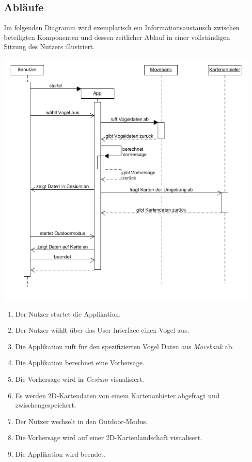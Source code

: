 \documentclass[12pt]{article} %
\newenvironment{cptenumerate}[1][label=\arabic*.]{\begin{enumerate}[#1] \setlength\itemsep{0em}}{\end{enumerate}}
\begin{document}
\subsection{Abläufe}

Im folgenden Diagramm wird exemplarisch ein Informationsaustausch zwischen beteiligten Komponenten und dessen zeitlicher Ablauf in einer vollständigen Sitzung des Nutzers illustriert. 

\includegraphics[width = 1\linewidth]{Sequenzdiagramm.png}

\begin{cptenumerate} 
 	 \item Der Nutzer startet die Applikation.
 	 \item Der Nutzer wählt über das User Interface einen Vogel aus.
 	 \item Die Applikation ruft für den spezifizierten Vogel Daten aus \textit{Movebank} ab.
 	 \item Die Applikation berechnet eine Vorhersage.
 	 \item Die Vorhersage wird in \textit{Cesium} visualisiert.
 	 \item Es werden 2D-Kartendaten von einem Kartenanbieter abgefragt und zwischengespeichert.
 	 \item Der Nutzer wechselt in den Outdoor-Modus.
 	 \item Die Vorhersage wird auf einer 2D-Kartenlandschaft visualisert.
 	 \item Die Applikation wird beendet.
\end{cptenumerate} 
\end{document}
